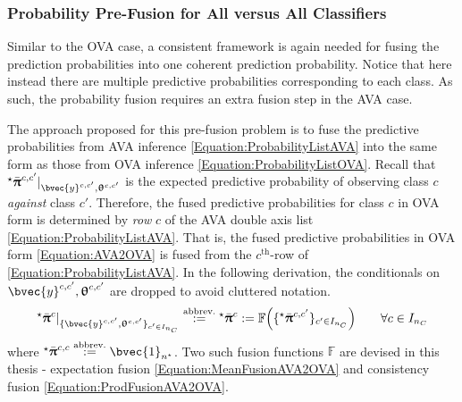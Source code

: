 			\subsubsection{Probability Pre-Fusion for All versus All Classifiers}
			\label{BenthicHabitatMapping:Classification:MulticlassClassification:ProbabilityPreFusion}
						
				Similar to the OVA case, a consistent framework is again needed for fusing the prediction probabilities into one coherent prediction probability. Notice that here instead there are multiple predictive probabilities corresponding to each class. As such, the probability fusion requires an extra fusion step in the AVA case. 
			
				The approach proposed for this pre-fusion problem is to fuse the predictive probabilities from AVA inference \eqref{Equation:ProbabilityListAVA} into the same form as those from OVA inference \eqref{Equation:ProbabilityListOVA}. Recall that ${^{\star}}\bar{\vec{\uppi}}^{c, c'} |_{\bvec{y}^{c, c'}, \vec{\uptheta}^{c, c'}}$ is the expected predictive probability of observing class $c$ \textit{against} class $c'$. Therefore, the fused predictive probabilities for class $c$ in OVA form is determined by \textit{row} $c$ of the AVA double axis list \eqref{Equation:ProbabilityListAVA}. That is, the fused predictive probabilities in OVA form \eqref{Equation:AVA2OVA} is fused from the $c^{\mathrm{th}}$-row of \eqref{Equation:ProbabilityListAVA}. In the following derivation, the conditionals on $\bvec{y}^{c, c'}, \vec{\uptheta}^{c, c'}$ are dropped to avoid cluttered notation. \begin{equation}
					\begin{aligned}
						{^{\star}}\bar{\vec{\uppi}}^{c} |_{\{ \bvec{y}^{c, c'}, \vec{\uptheta}^{c, c'} \}_{c' \in I_{n_{C}}}} \stackrel{\text{abbrev.}}{:=} {^{\star}}\bar{\vec{\uppi}}^{c} := \mathbb{F}\Big(\{{^{\star}}\bar{\vec{\uppi}}^{c, c'}\}_{c' \in I_{n_{C}}}\Big) \qquad \forall c \in I_{n_{C}}
					\end{aligned}
				\label{Equation:AVA2OVA}
				\end{equation} where ${^{\star}}\bar{\vec{\uppi}}^{c, c} \stackrel{\text{abbrev.}}{:=} \bvec{1}_{n^{\star}}$. Two such fusion functions $\mathbb{F}$ are devised in this thesis - expectation fusion \eqref{Equation:MeanFusionAVA2OVA} and consistency fusion \eqref{Equation:ProdFusionAVA2OVA}.
				
